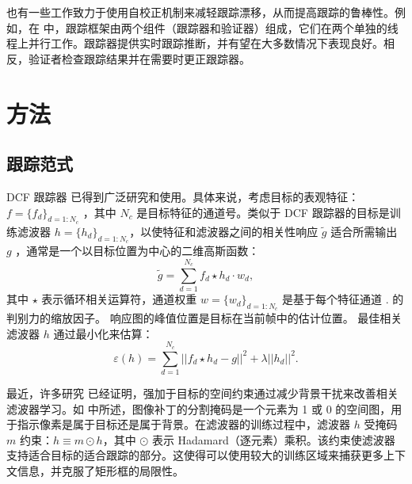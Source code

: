 也有一些工作致力于使用自校正机制来减轻跟踪漂移，从而提高跟踪的鲁棒性。例如，在 \cite{fan2018parallel} 中，跟踪框架由两个组件（跟踪器和验证器）组成，它们在两个单独的线程上并行工作。跟踪器提供实时跟踪推断，并有望在大多数情况下表现良好。相反，验证者检查跟踪结果并在需要时更正跟踪器。

\section{方法}

\subsection{跟踪范式}
DCF 跟踪器 \cite{Danelljan2014AccurateSE, henriques2014high-speed, Li2014ASA} 已得到广泛研究和使用。具体来说，考虑目标的表观特征：$f=\{f_d\}_{d=1:N_c}$ ，其中 $N_c$ 是目标特征的通道号。类似于 DCF 跟踪器的目标是训练滤波器 $h=\{h_d\}_{d=1:N_c}$，以使特征和滤波器之间的相关性响应 $\tilde{g}$ 适合所需输出 $g$ ，通常是一个以目标位置为中心的二维高斯函数： 
\begin{equation} \label{eq:dcf}
\tilde{g}=\sum_{d=1}^{N_c}f_d \star h_d \cdot w_d,
\end{equation}
其中 $\star$ 表示循环相关运算符，通道权重 $w = \{w_d\}_{d=1:N_c}$ 是基于每个特征通道 \cite{Lukezic2017DiscriminativeCF}.
的判别力的缩放因子。
响应图的峰值位置是目标在当前帧中的估计位置。
最佳相关滤波器 $h$ 通过最小化来估算：
\begin{equation}
\varepsilon(h) = \sum_{d=1}^{N_c}||f_d \star h_d - g||^2+\lambda||h_d||^2.
\end{equation}

最近，许多研究 \cite{Danelljan2015LearningSR, Lukezic2017DiscriminativeCF} 已经证明，强加于目标的空间约束通过减少背景干扰来改善相关滤波器学习。如 \cite{Lukezic2017DiscriminativeCF}中所述，图像补丁的分割掩码是一个元素为 1 或 0 的空间图，用于指示像素是属于目标还是属于背景。在滤波器的训练过程中，滤波器 $h$ 受掩码 $m$ 约束：$h \equiv m \odot h$，其中 $\odot$ 表示 Hadamard（逐元素）乘积。该约束使滤波器支持适合目标的适合跟踪的部分。这使得可以使用较大的训练区域来捕获更多上下文信息，并克服了矩形框的局限性。

